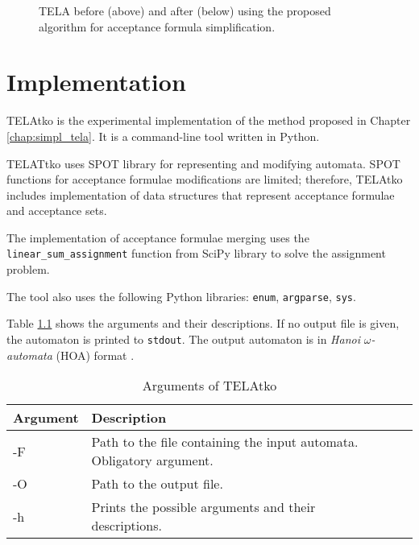 \documentclass[
  digital, %
  twoside, %
  table,   %
  lof,     %
  lot,     %
]{fithesis3}
\begin{document}
\begin{figure}[h]
  \caption{TELA before (above) and after (below) using the proposed algorithm for acceptance formula simplification.}
  \label{fig:big_example}
\end{figure}

\chapter{Implementation}
TELAtko is the experimental implementation of the method proposed in Chapter \ref{chap:simpl_tela}. It is a command-line tool written in Python.

TELATtko uses SPOT library \cite{spot} for representing and modifying automata. SPOT functions for acceptance formulae modifications are limited; therefore, TELAtko includes implementation of data structures that represent acceptance formulae and acceptance sets. 

The implementation of acceptance formulae merging uses the \texttt{linear\_sum\_assignment} function from SciPy library \cite{scipy} to solve the assignment problem. 

The tool also uses the following Python libraries: \texttt{enum}, \texttt{argparse}, \texttt{sys}.

Table \ref{tab:arguments} shows the arguments and their descriptions. If no output file is given, the automaton is printed to \texttt{stdout}. The output automaton is in \textit{Hanoi} $\omega$\textit{-automata} (HOA) format \cite{hoa}.

\begin{table}[h]
  \begin{tabularx}{\textwidth}{lXXX}
    \toprule
    Argument & Description \\
    \midrule
    -F & Path to the file containing the input automata. Obligatory argument. \\
    -O & Path to the output file. \\
    -h & Prints the possible arguments and their descriptions. \\    
    \bottomrule
  \end{tabularx}
  \caption{Arguments of TELAtko}
  \label{tab:arguments}
\end{table}
\end{document}
